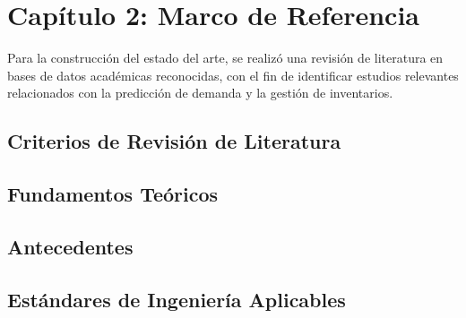 \section{Capítulo 2: Marco de Referencia}

Para la construcción del estado del arte, se realizó una revisión de literatura en bases de datos académicas reconocidas, con el fin de identificar estudios relevantes relacionados con la predicción de demanda y la gestión de inventarios.

\subsection{Criterios de Revisión de Literatura}


\subsection{Fundamentos Teóricos}



\subsection{Antecedentes}



\subsection{Estándares de Ingeniería Aplicables}

